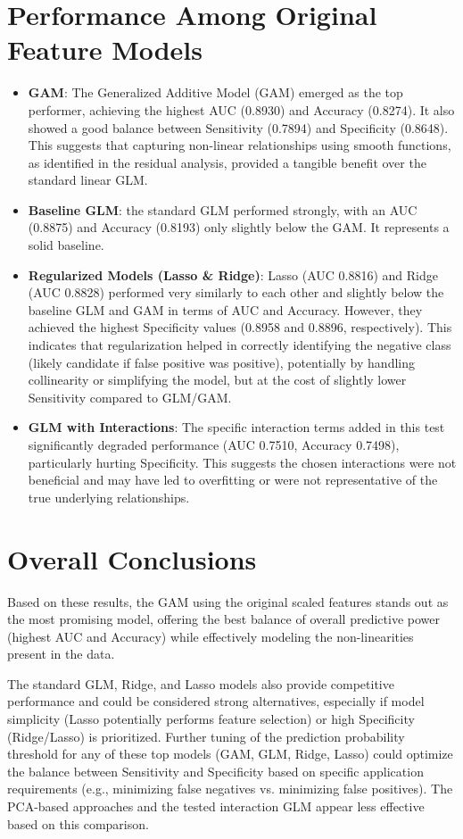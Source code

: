 \section{Performance Among Original Feature Models}
\begin{itemize}
    \item \textbf{GAM}: The Generalized Additive Model (GAM) emerged as the top performer, achieving the highest AUC (0.8930) and Accuracy (0.8274). It also showed a good balance between Sensitivity (0.7894) and Specificity (0.8648). This suggests that capturing non-linear relationships using smooth functions, as identified in the residual analysis, provided a tangible benefit over the standard linear GLM.
    \item \textbf{Baseline GLM}: the standard GLM performed strongly, with an AUC (0.8875) and Accuracy (0.8193) only slightly below the GAM. It represents a solid baseline.
    \item \textbf{Regularized Models (Lasso \& Ridge)}: Lasso (AUC 0.8816) and Ridge (AUC 0.8828) performed very similarly to each other and slightly below the baseline GLM and GAM in terms of AUC and Accuracy. However, they achieved the highest Specificity values (0.8958 and 0.8896, respectively). This indicates that regularization helped in correctly identifying the negative class (likely candidate if false positive was positive), potentially by handling collinearity or simplifying the model, but at the cost of slightly lower Sensitivity compared to GLM/GAM.
    \item \textbf{GLM with Interactions}: The specific interaction terms added in this test significantly degraded performance (AUC 0.7510, Accuracy 0.7498), particularly hurting Specificity. This suggests the chosen interactions were not beneficial and may have led to overfitting or were not representative of the true underlying relationships.
\end{itemize}

\section{Overall Conclusions}
Based on these results, the GAM using the original scaled features stands out as the most promising model, offering the best balance of overall predictive power (highest AUC and Accuracy) while effectively modeling the non-linearities present in the data.

The standard GLM, Ridge, and Lasso models also provide competitive performance and could be considered strong alternatives, especially if model simplicity (Lasso potentially performs feature selection) or high Specificity (Ridge/Lasso) is prioritized. Further tuning of the prediction probability threshold for any of these top models (GAM, GLM, Ridge, Lasso) could optimize the balance between Sensitivity and Specificity based on specific application requirements (e.g., minimizing false negatives vs. minimizing false positives). The PCA-based approaches and the tested interaction GLM appear less effective based on this comparison.

